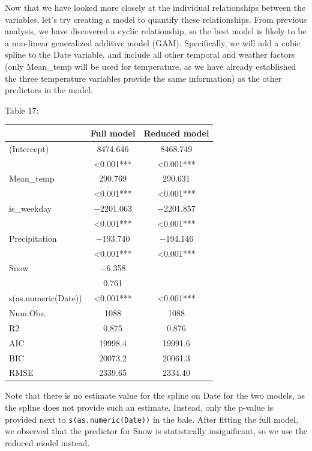 \documentclass[
]{article}
\begin{document}
Now that we have looked more closely at the individual relationships
between the variables, let's try creating a model to quantify these
relationships. From previous analysis, we have discovered a cyclic
relationship, so the best model is likely to be a non-linear generalized
additive model (GAM). Specifically, we will add a cubic spline to the
Date variable, and include all other temporal and weather factors (only
Mean\_temp will be used for temperature, as we have already established
the three temperature variables provide the same information) as the
other predictors in the model.

Table 17:

\begin{table}[!h]
\centering
\begin{tabular}[t]{lcc}
\toprule
  & Full model & Reduced model\\
\midrule
(Intercept) & \num{8474.646} & \num{8468.749}\\
 & \num{<0.001}*** & \vphantom{3} \num{<0.001}***\\
Mean\_temp & \num{290.769} & \num{290.631}\\
 & \num{<0.001}*** & \vphantom{2} \num{<0.001}***\\
is\_weekday & \num{-2201.063} & \num{-2201.857}\\
 & \num{<0.001}*** & \vphantom{1} \num{<0.001}***\\
Precipitation & \num{-193.740} & \num{-194.146}\\
 & \num{<0.001}*** & \num{<0.001}***\\
Snow & \num{-6.358} & \\
 & \num{0.761} & \\
s(as.numeric(Date)) & \num{<0.001}*** & \num{<0.001}***\\
\midrule
Num.Obs. & \num{1088} & \num{1088}\\
R2 & \num{0.875} & \num{0.876}\\
AIC & \num{19998.4} & \num{19991.6}\\
BIC & \num{20073.2} & \num{20061.3}\\
RMSE & \num{2339.65} & \num{2334.40}\\
\bottomrule
\end{tabular}
\end{table}

Note that there is no estimate value for the spline on Date for the two
models, as the spline does not provide such an estimate. Instead, only
the p-value is provided next to \texttt{s(as.numeric(Date))} in the
bale. After fitting the full model, we observed that the predictor for
Snow is statistically insignificant, so we use the reduced model
instead.
\end{document}
